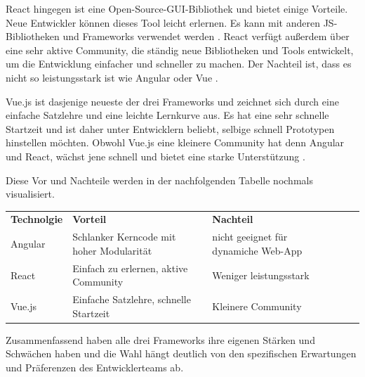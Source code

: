 React hingegen ist eine Open-Source-GUI-Bibliothek und bietet einige Vorteile. Neue Entwickler können dieses Tool leicht erlernen. Es kann mit anderen JS-Bibliotheken und Frameworks verwendet werden \cite{softwaredeveloperindia2022}. React verfügt außerdem über eine sehr aktive Community, die ständig neue Bibliotheken und Tools entwickelt, um die Entwicklung einfacher und schneller zu machen. Der Nachteil ist, dass es  nicht so leistungsstark ist wie Angular oder Vue \cite{logrocket2021}.\newline

Vue.js ist dasjenige neueste der drei Frameworks und zeichnet sich durch eine einfache Satzlehre und eine leichte Lernkurve aus. Es hat eine sehr schnelle Startzeit und ist daher unter Entwicklern beliebt, selbige schnell Prototypen hinstellen möchten\cite{logrocket2021}. Obwohl Vue.js eine kleinere Community hat denn Angular und React, wächst jene schnell und bietet eine starke Unterstützung \cite{codeinwp}.

Diese Vor und Nachteile werden in der nachfolgenden Tabelle nochmals visualisiert.\newline
\begin{center}
\begin{table}[h]
	\begin{tabularx}{4cm}{|l|l|p{4.5 cm}|ll}
		\cline{1-3}
		\textbf{Technolgie} & \textbf{Vorteil}                         & \textbf{Nachteil}                                                &  &  \\ \cline{1-3}
		Angular             & Schlanker Kerncode mit hoher Modularität & nicht geeignet für dynamiche Web-App  &  &  \\ \cline{1-3}
		React               & Einfach zu erlernen, aktive Community    & Weniger leistungsstark         &  &  \\ \cline{1-3}
		Vue.js              & Einfache Satzlehre, schnelle Startzeit   & Kleinere Community             &  &  \\ \cline{1-3}
	\end{tabularx}
\end{table}
\end{center}

Zusammenfassend haben alle drei Frameworks ihre eigenen Stärken und Schwächen haben und die Wahl hängt deutlich von den spezifischen Erwartungen und Präferenzen des Entwicklerteams ab.


